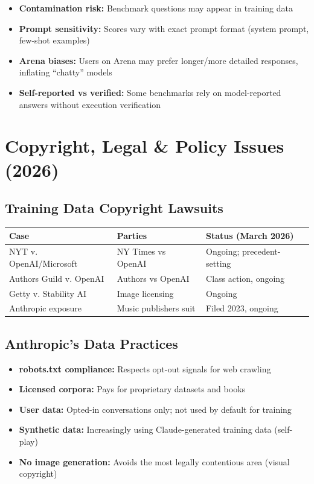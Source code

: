 \documentclass[11pt,a4paper]{article}
\begin{document}
\begin{itemize}[itemsep=1pt]
  \item \textbf{Contamination risk:} Benchmark questions may appear in training data
  \item \textbf{Prompt sensitivity:} Scores vary with exact prompt format (system prompt, few-shot examples)
  \item \textbf{Arena biases:} Users on Arena may prefer longer/more detailed responses, inflating ``chatty'' models
  \item \textbf{Self-reported vs verified:} Some benchmarks rely on model-reported answers without execution verification
\end{itemize}

\section{Copyright, Legal \& Policy Issues (2026)}

\subsection{Training Data Copyright Lawsuits}

\begin{center}
\begin{tabular}{lL{4cm}L{5cm}}
\toprule
\textbf{Case} & \textbf{Parties} & \textbf{Status (March 2026)} \\
\midrule
NYT v. OpenAI/Microsoft & NY Times vs OpenAI & Ongoing; precedent-setting \\
Authors Guild v. OpenAI & Authors vs OpenAI & Class action, ongoing \\
Getty v. Stability AI & Image licensing & Ongoing \\
Anthropic exposure & Music publishers suit & Filed 2023, ongoing \\
\bottomrule
\end{tabular}
\end{center}

\subsection{Anthropic's Data Practices}

\begin{itemize}[itemsep=1pt]
  \item \textbf{robots.txt compliance:} Respects opt-out signals for web crawling
  \item \textbf{Licensed corpora:} Pays for proprietary datasets and books
  \item \textbf{User data:} Opted-in conversations only; not used by default for training
  \item \textbf{Synthetic data:} Increasingly using Claude-generated training data (self-play)
  \item \textbf{No image generation:} Avoids the most legally contentious area (visual copyright)
\end{itemize}
\end{document}
